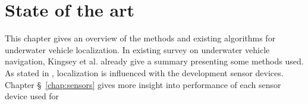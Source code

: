 \chapter{State of the art} \label{chap:state-of-the-art}

This chapter gives an overview of the methods and existing algorithms for underwater vehicle localization. In existing survey on underwater vehicle navigation, Kingsey et al. \cite{kinsey06} already give a summary presenting some methods used. As stated in \cite{kinsey06}, localization is influenced with the development sensor devices. Chapter \S~\ref{chap:sensors} gives more insight into performance of each sensor device used for 

